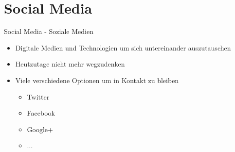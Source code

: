 \section{Social Media}

\begin{frame}{}
  \begin{center}
    \structure{\Large \insertsection}
  \end{center}
\end{frame}

\begin{frame}{Social Media - Soziale Medien}
\begin{itemize}
	\item <1-> Digitale Medien und Technologien um sich untereinander auszutauschen
	\item <2-> Heutzutage nicht mehr wegzudenken
	\item <3-> Viele verschiedene Optionen um in Kontakt zu bleiben
	\begin{itemize}
	\item <3-> Twitter
	\item <3-> Facebook
	\item <3-> Google+
	\item <3-> ...
	\end{itemize}
	
\end{itemize}

\end{frame}


